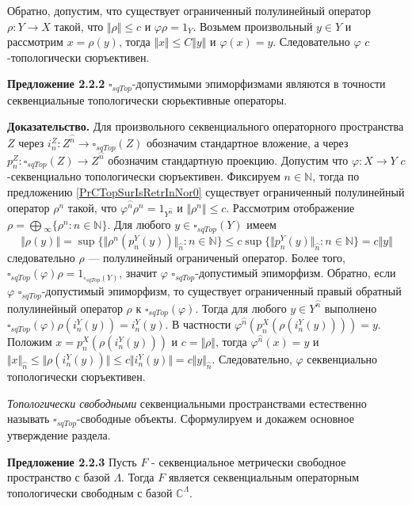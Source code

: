 \documentclass[12pt]{article}
\begin{document}
Обратно, допустим, что существует ограниченный полулинейный оператор $\rho:Y\to X$ такой, что $\Vert\rho\Vert\leq c$ и $\varphi\rho=1_Y$. Возьмем произвольный $y\in Y$ и рассмотрим $x=\rho(y)$, тогда $\Vert x\Vert\leq C\Vert y\Vert$ и $\varphi(x)=y$. Следовательно $\varphi$ $c$-топологически сюръективен.

\medskip

{\bf Предложение 2.2.2} $\square_{sqTop}$-допустимыми эпиморфизмами являются в точности секвенциальные топологически сюрьективные операторы.

{\bf Доказательство.} Для произвольного секвенциального операторного пространства $Z$ через $i_n^Z:Z^{\wideparen{n}}\to\square_{sqTop}(Z)$ обозначим стандартное вложение, а через $p_n^Z:\square_{sqTop}(Z)\to Z^{\wideparen{n}}$ обозначим 
стандартную проекцию. Допустим что $\varphi:X\to Y$ $c$-секвенциально топологически сюръективен. Фиксируем $n\in\mathbb{N}$, тогда по предложению \ref{PrCTopSurIsRetrInNor0} существует ограниченный полулинейный оператор $\rho^n$ такой, что $\varphi^{\wideparen{n}}\rho^n=1_{Y^{\wideparen{n}}}$ и $\Vert\rho^n\Vert\leq c$. Рассмотрим отображение 
$ \rho=\bigoplus{}_\infty\{\rho^n:n\in\mathbb{N}\}$. Для любого $y\in \square_{sqTop}(Y)$ имеем 
$$
\Vert \rho(y)\Vert=\sup\{\Vert\rho^n(p_n^Y(y))\Vert_{\wideparen{n}}: n\in\mathbb{N}\}\leq
c\sup\{\Vert p_n^Y(y)\Vert_{\wideparen{n}}: n\in\mathbb{N}\}=c\Vert y\Vert
$$
следовательно $\rho$ --- полулинейный ограниченый оператор. Более того, $\square_{sqTop}(\varphi)\rho=1_{\square_{sqTop}(Y)}$, значит $\varphi$ $\square_{sqTop}$-допустимый эпиморфизм. Обратно, если 
$\varphi$ $\square_{sqTop}$-допустимый эпиморфизм, то существует ограниченный правый обратный полулинейный оператор  $\rho$ к $\square_{sqTop}(\varphi)$. Тогда для 
любого $y\in Y^{\wideparen{n}}$ выполнено $\square_{sqTop}(\varphi)\rho(i_n^Y(y))=i_n^Y(y)$. В частности $\varphi^{\wideparen{n}}(p_n^X(\rho(i_n^Y(y))))=y$. Положим $x=p_n^X(\rho(i_n^Y(y)))$ и 
$c=\Vert\rho\Vert$, тогда $\varphi^{\wideparen{n}}(x)=y$ и $\Vert x\Vert_{\wideparen{n}}\leq\Vert\rho(i_n^Y(y))\Vert\leq c\Vert i_n^Y(y)\Vert=c\Vert y\Vert_{\wideparen{n}}$. Следовательно, 
$\varphi$  секвенциально топологически сюръективен.


\medskip

\textit{Топологически свободными} секвенциальными пространствами естественно называть $\square_{sqTop}$-свободные объекты. Сформулируем и докажем основное утверждение раздела.

\medskip

{\bf Предложение 2.2.3} Пусть $F$ -  секвенциальное метрически свободное пространство с базой $\Lambda$. Тогда $F$ является секвенциальным  операторным топологически свободным с базой $\mathbb{C}^{\Lambda}$.
\end{document}
